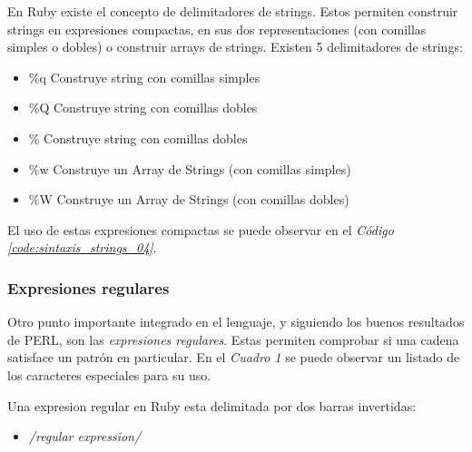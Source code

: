 \documentclass{article}
\newcommand{\refcode}[1]{\textit{Código \ref{#1}}}
\begin{document}
 
\bigskip

	En Ruby existe el concepto de delimitadores de strings. Estos permiten construir strings en expresiones compactas, en sus dos representaciones (con comillas simples o dobles) o construir arrays de strings. Existen 5 delimitadores de strings:
\bigskip

\begin{itemize}
	\itemsep=1pt \topsep=0pt \partopsep=0pt \parskip=0pt \parsep=0pt
	\item  \%q	Construye string con comillas simples
	\item  \%Q	Construye string con comillas dobles
	\item  \%        Construye string con comillas dobles
	\item \%w	Construye un Array de Strings (con comillas simples)
	\item  \%W     Construye un Array de Strings (con comillas dobles)
\end{itemize}
	

\noindent El uso de estas expresiones compactas se puede observar en el \refcode{code:sintaxis_strings_04}.

 
\bigskip



\subsubsection{Expresiones regulares}
Otro punto importante integrado en el lenguaje, y siguiendo los buenos resultados de PERL, son las \textit{expresiones regulares}. Estas permiten comprobar si una cadena satisface un patrón en particular. En el \textit{Cuadro 1} se puede observar un listado de los caracteres especiales para su uso.
	\par
	Una expresion regular en Ruby esta delimitada por dos barras invertidas:

\begin{itemize}
	\itemsep=1pt \topsep=0pt \partopsep=0pt \parskip=0pt \parsep=0pt
	\item  		\textit{/regular expression/}
\end{itemize}
\end{document}

